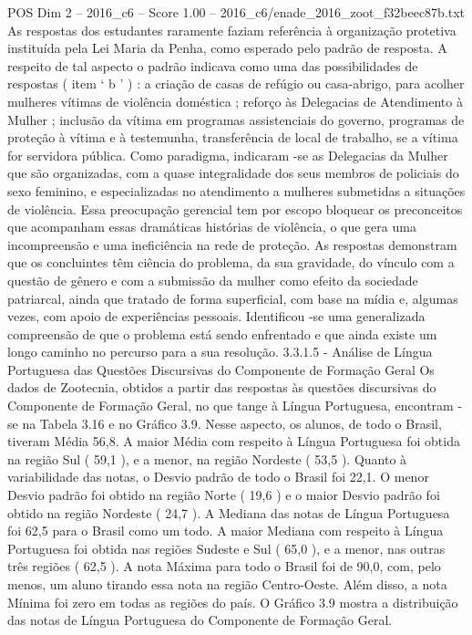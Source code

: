 \begin{textsample}{POS Dim 2 – 2016\_c6 – Score 1.00 – 2016\_c6/enade\_2016\_zoot\_f32beec87b.txt}
As respostas dos estudantes raramente faziam referência à organização protetiva instituída pela Lei Maria da Penha, como esperado pelo padrão de resposta.
A respeito de tal aspecto o padrão indicava como uma das possibilidades de respostas ( item ‘ b ’ ) : a criação de casas de refúgio ou casa-abrigo, para acolher mulheres vítimas de violência doméstica ; reforço às Delegacias de Atendimento à Mulher ; inclusão da vítima em programas assistenciais do governo, programas de proteção à vítima e à testemunha, transferência de local de trabalho, se a vítima for servidora pública.
Como paradigma, indicaram -se as Delegacias da Mulher que são organizadas, com a quase integralidade dos seus membros de policiais do sexo feminino, e especializadas no atendimento a mulheres submetidas a situações de violência.
Essa preocupação gerencial tem por escopo bloquear os preconceitos que acompanham essas dramáticas histórias de violência, o que gera uma incompreensão e uma ineficiência na rede de proteção.
As respostas demonstram que os concluintes têm ciência do problema, da sua gravidade, do vínculo com a questão de gênero e com a submissão da mulher como efeito da sociedade patriarcal, ainda que tratado de forma superficial, com base na mídia e, algumas vezes, com apoio de experiências pessoais.
Identificou -se uma generalizada compreensão de que o problema está sendo enfrentado e que ainda existe um longo caminho no percurso para a sua resolução. 3.3.1.5 - Análise de Língua Portuguesa das Questões Discursivas do Componente de Formação Geral Os dados de Zootecnia, obtidos a partir das respostas às questões discursivas do Componente de Formação Geral, no que tange à Língua Portuguesa, encontram -se na Tabela 3.16 e no Gráfico 3.9.
Nesse aspecto, os alunos, de todo o Brasil, tiveram Média 56,8.
A maior Média com respeito à Língua Portuguesa foi obtida na região Sul ( 59,1 ), e a menor, na região Nordeste ( 53,5 ).
Quanto à variabilidade das notas, o Desvio padrão de todo o Brasil foi 22,1.
O menor Desvio padrão foi obtido na região Norte ( 19,6 ) e o maior Desvio padrão foi obtido na região Nordeste ( 24,7 ).
A Mediana das notas de Língua Portuguesa foi 62,5 para o Brasil como um todo.
A maior Mediana com respeito à Língua Portuguesa foi obtida nas regiões Sudeste e Sul ( 65,0 ), e a menor, nas outras três regiões ( 62,5 ).
A nota Máxima para todo o Brasil foi de 90,0, com, pelo menos, um aluno tirando essa nota na região Centro-Oeste.
Além disso, a nota Mínima foi zero em todas as regiões do país.
O Gráfico 3.9 mostra a distribuição das notas de Língua Portuguesa do Componente de Formação Geral.

\end{textsample}

